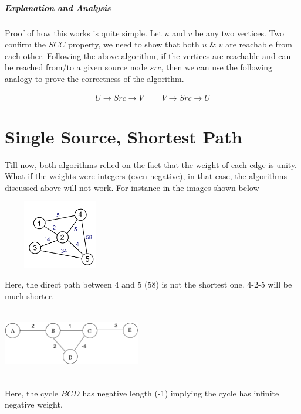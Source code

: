 \documentclass[11pt,a4paper]{extarticle}
\begin{document}
\subparagraph{Explanation and Analysis}
Proof of how this works is quite simple. Let $u$ and $v$ be any two vertices. Two confirm the $SCC$ property, we need to show that both $u$ \& $v$ are reachable from each other. Following the above algorithm, if the vertices are reachable and can be reached from/to a given source node $src$, then we can use the following analogy to prove the correctness of the algorithm.

\begin{align}
	U \longrightarrow Src \longrightarrow V \;\;\;\;\;\;\;\; V \longrightarrow Src \longrightarrow U
\end{align}

\section{Single Source, Shortest Path}
Till now, both algorithms relied on the fact that the weight of each edge is unity. What if the weights were integers (even negative), in that case, the algorithms discussed above will not work. For instance in the images shown below

\begin{multicols}{2}

\begin{center}
	\includegraphics[width=5cm, height=3cm]{shortest}
\end{center}
Here, the direct path between 4 and 5 (58) is not the shortest one. 4-2-5 will be much shorter.

\columnbreak

\begin{center}
	\includegraphics[width=6cm, height=3cm]{negative}
\end{center}

Here, the cycle $BCD$ has negative length (-1) implying the cycle has infinite negative weight.

\end{multicols}
\end{document}
